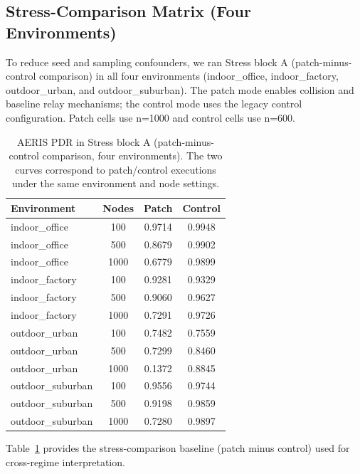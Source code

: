 ﻿\documentclass[sensors,article,submit,moreauthors,pdftex]{Definitions/mdpi}
\begin{document}
\subsection{Stress-Comparison Matrix (Four Environments)}
To reduce seed and sampling confounders, we ran Stress block A (patch-minus-control comparison) in all four environments (indoor\_office, indoor\_factory, outdoor\_urban, and outdoor\_suburban). The patch mode enables collision and baseline relay mechanisms; the control mode uses the legacy control configuration. Patch cells use n=1000 and control cells use n=600.

\begin{table}[H]
\caption{AERIS PDR in Stress block A (patch-minus-control comparison, four environments). The two curves correspond to patch/control executions under the same environment and node settings.}
\label{tab:s9_patch_control}
\centering
\begin{tabular}{lccc}
\toprule
Environment & Nodes & Patch & Control \\
\midrule
indoor\_office & 100  & 0.9714 & 0.9948 \\
indoor\_office & 500  & 0.8679 & 0.9902 \\
indoor\_office & 1000 & 0.6779 & 0.9899 \\
indoor\_factory & 100  & 0.9281 & 0.9329 \\
indoor\_factory & 500  & 0.9060 & 0.9627 \\
indoor\_factory & 1000 & 0.7291 & 0.9726 \\
outdoor\_urban & 100  & 0.7482 & 0.7559 \\
outdoor\_urban & 500  & 0.7299 & 0.8460 \\
outdoor\_urban & 1000 & 0.1372 & 0.8845 \\
outdoor\_suburban & 100  & 0.9556 & 0.9744 \\
outdoor\_suburban & 500  & 0.9198 & 0.9859 \\
outdoor\_suburban & 1000 & 0.7280 & 0.9897 \\
\bottomrule
\end{tabular}
\end{table}

Table~\ref{tab:s9_patch_control} provides the stress-comparison baseline (patch minus control) used for cross-regime interpretation.
\end{document}

